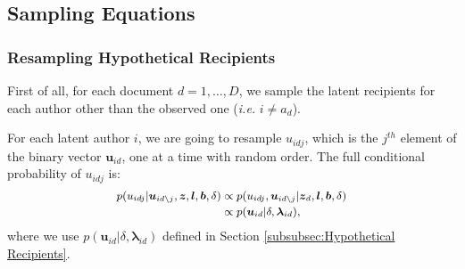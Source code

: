 \documentclass[twoside]{article}
\begin{document}
  	 \subsection{Sampling Equations}\label{subsec:Sampling Equations}
  	  \subsubsection{Resampling Hypothetical Recipients} \label{subsubsec: Resampling Hypothetical Recipients}
  	  First of all, for each document $d=1,\ldots, D$, we sample the latent recipients for each author other than the observed one (\textit{i.e.} $i \neq a_d$). 
  	  
  	  For each latent author $i$, we are going to resample $u_{idj}$, which is the $j^{th}$ element of the binary vector $\boldsymbol{u}_{id}$, one at a time with random order. The full conditional probability of $u_{idj}$ is:
  	  \begin{equation*}
  	    	 \footnotesize
  	  \begin{aligned}
  	  p(u_{idj}|\boldsymbol{u}_{id\backslash j},  \boldsymbol{z},\boldsymbol{l},\boldsymbol{b}, \delta)&\propto p(u_{idj}, \boldsymbol{u}_{id\backslash j}|\boldsymbol{z}_d,\boldsymbol{l},\boldsymbol{b}, \delta)
  	  \\&\propto p(\boldsymbol{u}_{id}|\delta, \boldsymbol{\lambda}_{id}),
  	  \end{aligned}
  	  \label{eqn:latentreceiver}
  	  \end{equation*}
  	  where we use $p(\boldsymbol{u}_{id}|\delta, \boldsymbol{\lambda}_{id})$ defined in Section \ref{subsubsec:Hypothetical Recipients}.
  	  
\end{document}
